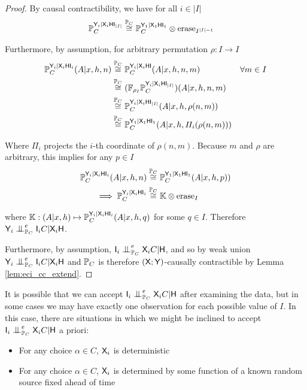 \begin{proof}
By causal contractibility, we have for all $i\in |I|$
\begin{align}
    \mathbb{P}_C^{\mathsf{Y}_i|\mathsf{X}_i\mathsf{H}\mathsf{I}_{|I|}} &\overset{\mathbb{P}_C}{\cong} \mathbb{P}_C^{\mathsf{Y}_1|\mathsf{X}_1\mathsf{H}\mathsf{I}_1}\otimes \text{erase}_{I^{|I|-1}}
\end{align}

Furthermore, by assumption, for arbitrary permutation $\rho:I\to I$
\begin{align}
    \mathbb{P}_C^{\mathsf{Y}_i|\mathsf{X}_i\mathsf{H}\mathsf{I}_i}(A|x,h,n) &\overset{\mathbb{P}_C}{\cong} \mathbb{P}_C^{\mathsf{Y}_i|\mathsf{X}_i\mathsf{H}\mathsf{I}}(A|x,h,n,m) & \forall m\in I\\
     &\overset{\mathbb{P}_C}{\cong} (\mathbb{F}_{\rho_I}\mathbb{P}_C^{\mathsf{Y}_i|\mathsf{X}_i\mathsf{H}\mathsf{I}_{|I|}})(A|x,h,n,m)\\
    &\overset{\mathbb{P}_C}{\cong} \mathbb{P}_C^{\mathsf{Y}_i|\mathsf{X}_i\mathsf{H}\mathsf{I}_{|I|}}(A|x,h,\rho(n,m))\\
    &\overset{\mathbb{P}_C}{\cong} \mathbb{P}_C^{\mathsf{Y}_1|\mathsf{X}_1\mathsf{H}\mathsf{I}_1}(A|x,h,\Pi_i(\rho(n,m)))
\end{align}

Where $\Pi_i$ projects the $i$-th coordinate of $\rho(n,m)$. Because $m$ and $\rho$ are arbitrary, this implies for any $p\in I$
\begin{align}
    \mathbb{P}_C^{\mathsf{Y}_i|\mathsf{X}_i\mathsf{H}\mathsf{I}_i}(A|x,h,n) &\overset{\mathbb{P}_C}{\cong} \mathbb{P}_C^{\mathsf{Y}_1|\mathsf{X}_1\mathsf{H}\mathsf{I}_1}(A|x,h,p))\\
    \implies \mathbb{P}_C^{\mathsf{Y}_i|\mathsf{X}_i\mathsf{H}\mathsf{I}_i} &\overset{\mathbb{P}_C}{\cong} \mathbb{K}\otimes \text{erase}_I
\end{align}

where $\mathbb{K}:(A|x,h)\mapsto \mathbb{P}_C^{\mathsf{Y}_i|\mathsf{X}_i\mathsf{H}\mathsf{I}_i}(A|x,h,q)$ for some $q\in I$. Therefore $\RV{Y}_i\CI^e_{\prob{P}_C}\RV{I}_iC|\RV{X}_i\RV{H}$.

Furthermore, by assumption, $\RV{I}_i\CI^e_{\prob{P}_C} \RV{X}_i C|\RV{H}$, and so by weak union $\RV{Y}_i\CI_{\prob{P}_C}^e \RV{I}_i C|\RV{X}_i\RV{H}$ and $\mathbb{P}_C$ is therefore $(\mathsf{X};\mathsf{Y})$-causally contractible by Lemma \ref{lem:eci_cc_extend}.
\end{proof}

It is possible that we can accept $\RV{I}_i\CI^e_{\prob{P}_C} \RV{X}_i C|\RV{H}$ after examining the data, but in some cases we may have exactly one observation for each possible value of $I$. In this case, there are situations in which we might be inclined to accept $\RV{I}_i\CI^e_{\prob{P}_C} \RV{X}_i C|\RV{H}$ a priori:
\begin{itemize}
    \item For any choice $\alpha\in C$, $\mathsf{X}_i$ is deterministic
    \item For any choice $\alpha\in C$, $\mathsf{X}_i$ is determined by some function of a known random source fixed ahead of time
\end{itemize}

